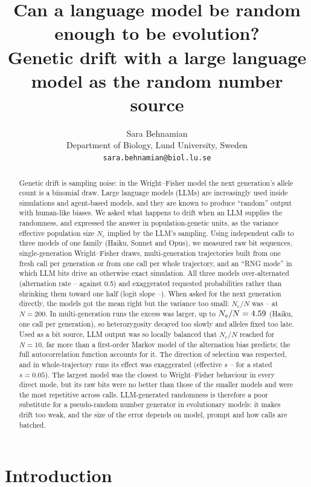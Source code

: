 \documentclass[11pt,a4paper]{article}
\title{Can a language model be random enough to be evolution?\\
\large Genetic drift with a large language model as the random number source}
\author{Sara Behnamian\\
\small Department of Biology, Lund University, Sweden\\
\small \texttt{sara.behnamian@biol.lu.se}}
\date{}
\newcommand{\Ne}{N_e}
\begin{document}
\maketitle

\begin{abstract}
Genetic drift is sampling noise: in the Wright--Fisher model the next generation's allele count is a binomial draw.
Large language models (LLMs) are increasingly used inside simulations and agent-based models, and they are known to produce ``random'' output with human-like biases.
We asked what happens to drift when an LLM supplies the randomness, and expressed the answer in population-genetic units, as the variance effective population size $\Ne$ implied by the LLM's sampling.
Using \nCalls{} independent calls to three models of one family (Haiku, Sonnet and Opus), we measured raw bit sequences, single-generation Wright--Fisher draws, multi-generation trajectories built from one fresh call per generation or from one call per whole trajectory, and an ``RNG mode'' in which LLM bits drive an otherwise exact simulation.
All three models over-alternated (alternation rate \bitsOpusAlt--\bitsSonnetAlt{} against 0.5) and exaggerated requested probabilities rather than shrinking them toward one half (logit slope \slopeOpus--\slopeHaiku).
When asked for the next generation directly, the models got the mean right but the variance too small: $\Ne/N$ was \dNeOpusTwoHundred--\dNeHaikuTwoHundred{} at $N=200$.
In multi-generation runs the excess was larger, up to $\Ne/N=\MlNeHaikuTen$ (Haiku, one call per generation), so heterozygosity decayed too slowly and alleles fixed too late.
Used as a bit source, LLM output was so locally balanced that $\Ne/N$ reached \rngNeSonnetHalf{} for $N=10$, far more than a first-order Markov model of the alternation bias predicts; the full autocorrelation function accounts for it.
The direction of selection was respected, and in whole-trajectory runs its effect was exaggerated (effective $s$ \WhSeffSonnet--\WhSeffHaiku{} for a stated $s=0.05$).
The largest model was the closest to Wright--Fisher behaviour in every direct mode, but its raw bits were no better than those of the smaller models and were the most repetitive across calls.
LLM-generated randomness is therefore a poor substitute for a pseudo-random number generator in evolutionary models: it makes drift too weak, and the size of the error depends on model, prompt and how calls are batched.
\end{abstract}

\section{Introduction}
\end{document}
